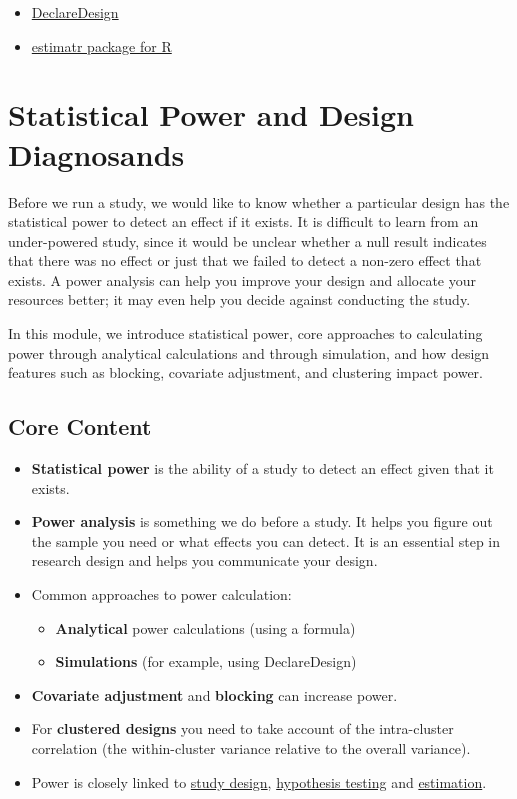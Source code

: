 \documentclass[12pt,]{book}
\begin{document}
\begin{itemize}
\item
  \href{https://declaredesign.org}{DeclareDesign}
\item
  \href{https://declaredesign.org/r/estimatr/}{estimatr package for R}
\end{itemize}

\hypertarget{statistical-power-and-design-diagnosands}{%
\chapter{Statistical Power and Design Diagnosands}\label{statistical-power-and-design-diagnosands}}

Before we run a study, we would like to know whether a particular design has the statistical power to detect an effect if it exists. It is difficult to learn from an under-powered study, since it would be unclear whether a null result indicates that there was no effect or just that we failed to detect a non-zero effect that exists. A power analysis can help you improve your design and allocate your resources better; it may even help you decide against conducting the study.

In this module, we introduce statistical power, core approaches to calculating power through analytical calculations and through simulation, and how design features such as blocking, covariate adjustment, and clustering impact power.

\hypertarget{core-content-5}{%
\section{Core Content}\label{core-content-5}}

\begin{itemize}
\item
  \textbf{Statistical power} is the ability of a study to detect an effect given that it exists.
\item
  \textbf{Power analysis} is something we do before a study. It helps you figure out the sample you need or what effects you can detect. It is an essential step in research design and helps you communicate your design.
\item
  Common approaches to power calculation:

  \begin{itemize}
  \item
    \textbf{Analytical} power calculations (using a formula)
  \item
    \textbf{Simulations} (for example, using DeclareDesign)
  \end{itemize}
\item
  \textbf{Covariate adjustment} and \textbf{blocking} can increase power.
\item
  For \textbf{clustered designs} you need to take account of the intra-cluster correlation (the within-cluster variance relative to the overall variance).
\item
  Power is closely linked to \href{the-research-design-process.html}{study design}, \href{hypothesis-testing.html}{hypothesis testing} and \href{estimands-and-estimators.html}{estimation}.
\end{itemize}
\end{document}

